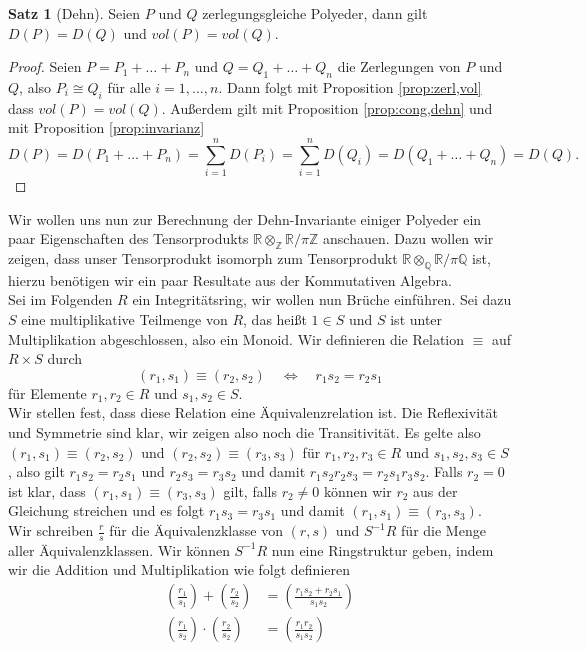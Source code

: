 \documentclass[11pt,titlepage]{article}
\newcommand{\setZ}{\mathbb{Z}}
\newcommand{\setQ}{\mathbb{Q}}
\newcommand{\setR}{\mathbb{R}}
\theoremstyle{definition}
\newtheorem{theorem}{Satz}[section]
\theoremstyle{remark}
\begin{document}
	\begin{theorem}[Dehn] \label{thm:dehn}
		Seien $P$ und $Q$ zerlegungsgleiche Polyeder, dann gilt $D(P)=D(Q)$ und $vol(P)=vol(Q)$.
	\end{theorem}
	
	\begin{proof}
		Seien $P=P_1+\ldots+P_n$ und $Q=Q_1+\ldots+Q_n$ die Zerlegungen von $P$ und 
		$Q$, also $P_i\cong Q_i$ für alle $i=1,\ldots,n$. Dann folgt mit Proposition \ref{prop:zerl,vol}
		dass $vol(P)=vol(Q)$. Außerdem gilt mit Proposition \ref{prop:cong,dehn}
		und mit Proposition \ref{prop:invarianz}
		\[D(P)=D(P_1+\ldots+P_n)=\sum_{i=1}^n D(P_i) =\sum_{i=1}^n D(Q_i)=D(Q_1+\ldots+Q_n)=D(Q).\]
	\end{proof}
	
	Wir wollen uns nun zur Berechnung der Dehn-Invariante einiger Polyeder ein paar Eigenschaften des Tensorprodukts $\setR\otimes_{\setZ}\setR /\pi\setZ$ anschauen. Dazu wollen wir zeigen, dass unser Tensorprodukt isomorph zum Tensorprodukt  
	$\setR\otimes_{\setQ}\setR /\pi\setQ$ ist, hierzu benötigen wir ein 
	paar Resultate 
	aus der Kommutativen Algebra. \\
	Sei im Folgenden $R$ ein Integritätsring, wir wollen nun 
	Brüche einführen. Sei dazu $S$ eine multiplikative Teilmenge von $R$, das heißt  
	$1\in S$ und $S$ ist unter Multiplikation abgeschlossen, also ein Monoid. Wir 
	definieren die Relation $\equiv$ auf $R\times S$ durch
	\[(r_1,s_1)\equiv(r_2,s_2)\quad \Leftrightarrow\quad r_1 s_2 =r_2 s_1\]
	für Elemente $r_1,r_2\in R$ und $s_1,s_2\in S$. \\
	Wir stellen fest, dass diese Relation  eine Äquivalenzrelation ist. Die 
	Reflexivität und Symmetrie sind klar, wir zeigen also noch die Transitivität.
	Es gelte also $(r_1,s_1)\equiv(r_2,s_2)$ und $(r_2,s_2)\equiv(r_3,s_3)$ für 
	$r_1,r_2,r_3\in R$ und $s_1,s_2,s_3\in S$, also gilt $r_1 s_2= r_2 s_1$ und 
	$r_2 s_3 =r_3 s_2$ und damit $r_1 s_2 r_2 s_3 =r_2 s_1 r_3 s_2$. Falls $r_2=0$ 
	ist klar, dass $(r_1,s_1)\equiv(r_3,s_3)$ gilt, falls $r_2\neq 0$ können wir $r_2$ aus der Gleichung streichen und es folgt 
	$r_1 s_3=r_3 s_1$ und damit $(r_1,s_1)\equiv(r_3,s_3)$. \\
	Wir schreiben $\frac{r}{s}$ für die Äquivalenzklasse von $(r,s)$ und $S^{-1}R$ 
	für die Menge aller Äquivalenzklassen. Wir können $S^{-1}R$ nun eine Ringstruktur geben, indem wir die Addition und Multiplikation wie folgt definieren
	\begin{align*}
		\left(\frac{r_1}{s_1}\right)+\left(\frac{r_2}{s_2}\right)
		&=\left(\frac{r_1s_2+r_2s_1}{s_1s_2}\right) \\
		\left(\frac{r_1}{s_2}\right)\cdot\left(\frac{r_2}{s_2}\right)
		&=\left(\frac{r_1r_2}{s_1s_2}\right)
	\end{align*}
\end{document}
